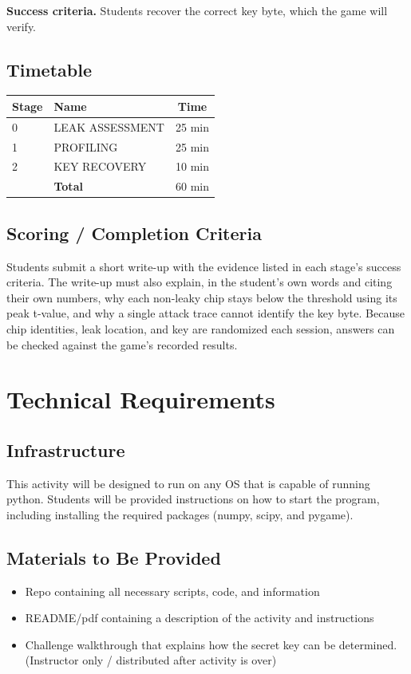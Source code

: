 \documentclass[11pt]{article}
\begin{document}
\noindent\textbf{Success criteria.} Students recover the correct key byte, which the game will verify.

\subsection{Timetable}
\begin{tabular}{@{}l l c@{}}
  \toprule
  \textbf{Stage} & \textbf{Name} & \textbf{Time} \\
  \midrule
  0 & LEAK ASSESSMENT & 25 min \\
  1 & PROFILING & 25 min \\
  2 & KEY RECOVERY & 10 min \\
  \midrule
  & \hfill\textbf{Total} & 60 min \\
  \bottomrule
\end{tabular}
 
\subsection{Scoring / Completion Criteria} Students submit a short write-up with the evidence listed in each stage’s success criteria. The write-up must also explain, in the student’s own words and citing their own numbers, why each non-leaky chip stays below the threshold using its peak t-value, and why a single attack trace cannot identify the key byte. Because chip identities, leak location, and key are randomized each session, answers can be checked against the game’s recorded results.


 
\section{Technical Requirements}
 
\subsection{Infrastructure}
This activity will be designed to run on any OS that is capable of running python. Students will be provided instructions on how to start the program, including installing the required packages (numpy, scipy, and pygame).
 
\subsection{Materials to Be Provided}
\begin{itemize}[label=--]
  \item{} Repo containing all necessary scripts, code, and information
  \item{} README/pdf containing a description of the activity and instructions
  \item{} Challenge walkthrough that explains how the secret key can be determined. \newline (Instructor only / distributed after activity is over)
\end{itemize}
\end{document}
